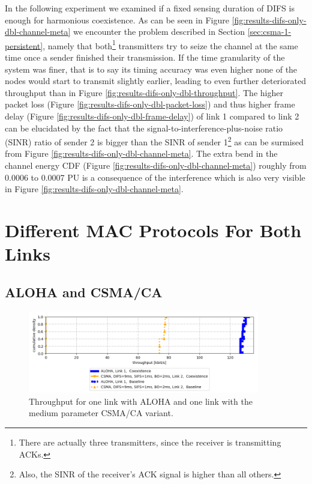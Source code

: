 In the following experiment we examined if a fixed sensing duration of DIFS is enough for harmonious coexistence. As can be seen in Figure \ref{fig:results-difs-only-dbl-channel-meta} we encounter the problem described in Section \ref{sec:csma-1-persistent}, namely that both\footnote{There are actually three transmitters, since the receiver is transmitting ACKs.} transmitters try to seize the channel at the same time once a sender finished their transmission. If the time granularity of the system was finer, that is to say its timing accuracy was even higher none of the nodes would start to transmit slightly earlier, leading to even further deteriorated throughput than in Figure \ref{fig:results-difs-only-dbl-throughput}. The higher packet loss (Figure \ref{fig:results-difs-only-dbl-packet-loss}) and thus higher frame delay (Figure \ref{fig:results-difs-only-dbl-frame-delay}) of link 1 compared to link 2  can be elucidated by the fact that the signal-to-interference-plus-noise ratio (SINR) ratio of sender 2 is bigger than the SINR of sender 1\footnote{Also, the SINR of the receiver's ACK signal is higher than all others.} as can be surmised from Figure \ref{fig:results-difs-only-dbl-channel-meta}. The extra bend in the channel energy CDF (Figure \ref{fig:results-difs-only-dbl-channel-meta}) roughly from 0.0006 to 0.0007 PU is a consequence of the interference which is also very visible in Figure \ref{fig:results-difs-only-dbl-channel-meta}.

\clearpage

\section{Different MAC Protocols For Both Links}
\label{sec:different-protocols}

\subsection{ALOHA and CSMA/CA}
\label{sec:aloha-csma}

\begin{figure}[tb]
	\label{fig:results-aloha-csma-throughput}
	\begin{center}
		\includegraphics[width=0.9\textwidth]{pictures/results/different_combinations/aloha_csma/throughput_cdf}
	\end{center}
	\caption{Throughput for one link with ALOHA and one link with the medium parameter CSMA/CA variant.}
\end{figure}

